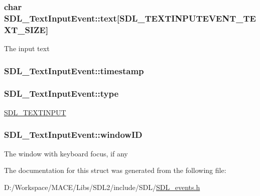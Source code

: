 \subsubsection[{\texorpdfstring{text}{text}}]{\setlength{\rightskip}{0pt plus 5cm}char S\+D\+L\+\_\+\+Text\+Input\+Event\+::text\mbox{[}{\bf S\+D\+L\+\_\+\+T\+E\+X\+T\+I\+N\+P\+U\+T\+E\+V\+E\+N\+T\+\_\+\+T\+E\+X\+T\+\_\+\+S\+I\+ZE}\mbox{]}}\hypertarget{struct_s_d_l___text_input_event_a1a95531f466dff01c2f108f53ff24554}{}\label{struct_s_d_l___text_input_event_a1a95531f466dff01c2f108f53ff24554}
The input text 
\subsubsection[{\texorpdfstring{timestamp}{timestamp}}]{ S\+D\+L\+\_\+\+Text\+Input\+Event\+::timestamp}\hypertarget{struct_s_d_l___text_input_event_a20b190a96494918690ea7f99187be948}{}\label{struct_s_d_l___text_input_event_a20b190a96494918690ea7f99187be948}
\subsubsection[{\texorpdfstring{type}{type}}]{ S\+D\+L\+\_\+\+Text\+Input\+Event\+::type}\hypertarget{struct_s_d_l___text_input_event_a90576be2ea52e694deff40d0586654f5}{}\label{struct_s_d_l___text_input_event_a90576be2ea52e694deff40d0586654f5}
\hyperlink{_s_d_l__events_8h_a3b589e89be6b35c02e0dd34a55f3fccaa4fa2570088f6b9cbd109ae91b511368f}{S\+D\+L\+\_\+\+T\+E\+X\+T\+I\+N\+P\+UT} 
\subsubsection[{\texorpdfstring{window\+ID}{windowID}}]{ S\+D\+L\+\_\+\+Text\+Input\+Event\+::window\+ID}\hypertarget{struct_s_d_l___text_input_event_aeb4f7a939353990ca40261ffbfbeb3d0}{}\label{struct_s_d_l___text_input_event_aeb4f7a939353990ca40261ffbfbeb3d0}
The window with keyboard focus, if any 

The documentation for this struct was generated from the following file\+:\begin{DoxyCompactItemize}
\item 
D\+:/\+Workspace/\+M\+A\+C\+E/\+Libs/\+S\+D\+L2/include/\+S\+D\+L/\hyperlink{_s_d_l__events_8h}{S\+D\+L\+\_\+events.\+h}\end{DoxyCompactItemize}
